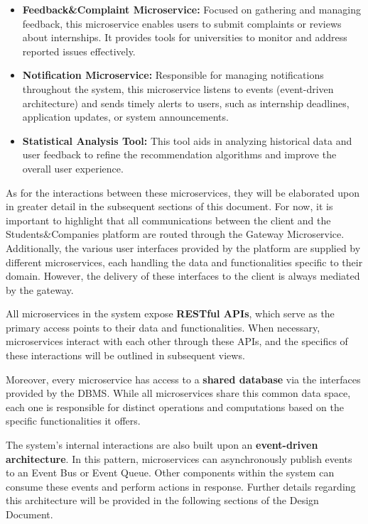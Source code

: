 \begin{itemize}
    \item \textbf{Feedback\&Complaint Microservice:} Focused on gathering and managing feedback, this microservice enables users to submit complaints or reviews about internships. It provides tools for universities to monitor and address reported issues effectively.

    \item \textbf{Notification Microservice:} Responsible for managing notifications throughout the system, this microservice listens to events (event-driven architecture) and sends timely alerts to users, such as internship deadlines, application updates, or system announcements.

    \item \textbf{Statistical Analysis Tool:} This tool aids in analyzing historical data and user feedback to refine the recommendation algorithms and improve the overall user experience.
\end{itemize}

As for the interactions between these microservices, they will be elaborated upon in greater detail in the subsequent sections of this document. For now, it is important to highlight that all communications between the client and the Students\&Companies platform are routed through the Gateway Microservice. Additionally, the various user interfaces provided by the platform are supplied by different microservices, each handling the data and functionalities specific to their domain. However, the delivery of these interfaces to the client is always mediated by the gateway.

All microservices in the system expose \textbf{RESTful APIs}, which serve as the primary access points to their data and functionalities. When necessary, microservices interact with each other through these APIs, and the specifics of these interactions will be outlined in subsequent views.

Moreover, every microservice has access to a \textbf{shared database} via the interfaces provided by the DBMS. While all microservices share this common data space, each one is responsible for distinct operations and computations based on the specific functionalities it offers.

The system’s internal interactions are also built upon an \textbf{event-driven architecture}. In this pattern, microservices can asynchronously publish events to an Event Bus or Event Queue. Other components within the system can consume these events and perform actions in response. Further details regarding this architecture will be provided in the following sections of the Design Document.

